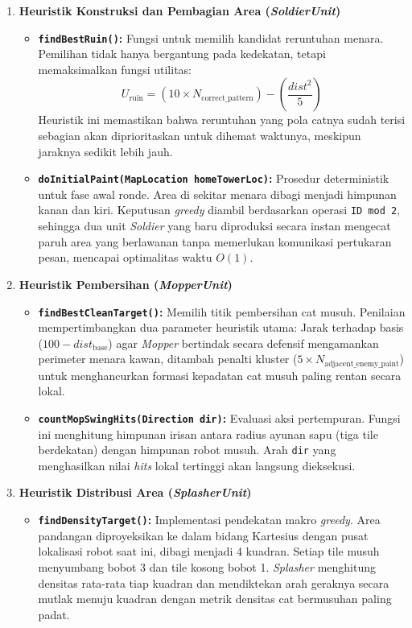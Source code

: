 \begin{enumerate}
    \item \textbf{Heuristik Konstruksi dan Pembagian Area (\textit{SoldierUnit})}
    \begin{itemize}
        \item \textbf{\texttt{findBestRuin()}:} Fungsi untuk memilih kandidat reruntuhan menara. Pemilihan tidak hanya bergantung pada kedekatan, tetapi memaksimalkan fungsi utilitas:
        \begin{equation}
            U_{\text{ruin}} = (10 \times N_{\text{correct\_pattern}}) - \left(\frac{dist^2}{5}\right)
        \end{equation}
        Heuristik ini memastikan bahwa reruntuhan yang pola catnya sudah terisi sebagian akan diprioritaskan untuk dihemat waktunya, meskipun jaraknya sedikit lebih jauh.
        \item \textbf{\texttt{doInitialPaint(MapLocation homeTowerLoc)}:} Prosedur deterministik untuk fase awal ronde. Area di sekitar menara dibagi menjadi himpunan kanan dan kiri. Keputusan \textit{greedy} diambil berdasarkan operasi \texttt{ID mod 2}, sehingga dua unit \textit{Soldier} yang baru diproduksi secara instan mengecat paruh area yang berlawanan tanpa memerlukan komunikasi pertukaran pesan, mencapai optimalitas waktu $O(1)$.
    \end{itemize}

    \item \textbf{Heuristik Pembersihan (\textit{MopperUnit})}
    \begin{itemize}
        \item \textbf{\texttt{findBestCleanTarget()}:} Memilih titik pembersihan cat musuh. Penilaian mempertimbangkan dua parameter heuristik utama: Jarak terhadap basis ($100 - dist_{\text{base}}$) agar \textit{Mopper} bertindak secara defensif mengamankan perimeter menara kawan, ditambah penalti kluster ($5 \times N_{\text{adjacent\_enemy\_paint}}$) untuk menghancurkan formasi kepadatan cat musuh paling rentan secara lokal.
        \item \textbf{\texttt{countMopSwingHits(Direction dir)}:} Evaluasi aksi pertempuran. Fungsi ini menghitung himpunan irisan antara radius ayunan sapu (tiga tile berdekatan) dengan himpunan robot musuh. Arah \texttt{dir} yang menghasilkan nilai \textit{hits} lokal tertinggi akan langsung dieksekusi.
    \end{itemize}

    \item \textbf{Heuristik Distribusi Area (\textit{SplasherUnit})}
    \begin{itemize}
        \item \textbf{\texttt{findDensityTarget()}:} Implementasi pendekatan makro \textit{greedy}. Area pandangan diproyeksikan ke dalam bidang Kartesius dengan pusat lokalisasi robot saat ini, dibagi menjadi 4 kuadran. Setiap tile musuh menyumbang bobot 3 dan tile kosong bobot 1. \textit{Splasher} menghitung densitas rata-rata tiap kuadran dan mendiktekan arah geraknya secara mutlak menuju kuadran dengan metrik densitas cat bermusuhan paling padat.
    \end{itemize}


\end{enumerate}
